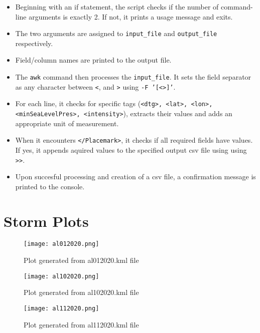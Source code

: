 \documentclass[]{article}
\begin{document}
\begin{itemize}
    \item Beginning with an if statement, the script checks if the number of command-line arguments is exactly 2. If not, it prints a usage message and exits.
    \item The two arguments are assigned to \texttt{input\_file} and \texttt{output\_file} respectively.
    \item Field/column names are printed to the output file.
    \item The \texttt{awk} command then processes the \texttt{input\_file}. It sets the field separator as any character between \texttt{<}, and \texttt{>} using \texttt{-F '[<>]'}.
    \item For each line, it checks for specific tags (\texttt{<dtg>, <lat>, <lon>, <minSeaLevelPres>, <intensity>}), extracts their values and adds an appropriate unit of measurement.
    \item When it encounters \texttt{</Placemark>}, it checks if all required fields have values. If yes, it appends aquired values to the specified output csv file using using \texttt{>>}.
    \item Upon succesful processing and creation of a csv file, a confirmation message is printed to the console.
\end{itemize}

\clearpage

\section{Storm Plots}
\begin{figure}[h]
    \centering
    \texttt{[image: al012020.png]}
    \caption{Plot generated from al012020.kml file}
    \label{fig:sample}
\end{figure}
\begin{figure}[h]
    \centering
    \texttt{[image: al102020.png]}
    \caption{Plot generated from al102020.kml file}
    \label{fig:sample}
\end{figure}
\begin{figure}[h]
    \centering
    \texttt{[image: al112020.png]}
    \caption{Plot generated from al112020.kml file}
    \label{fig:sample}
\end{figure}

\clearpage
\end{document}
